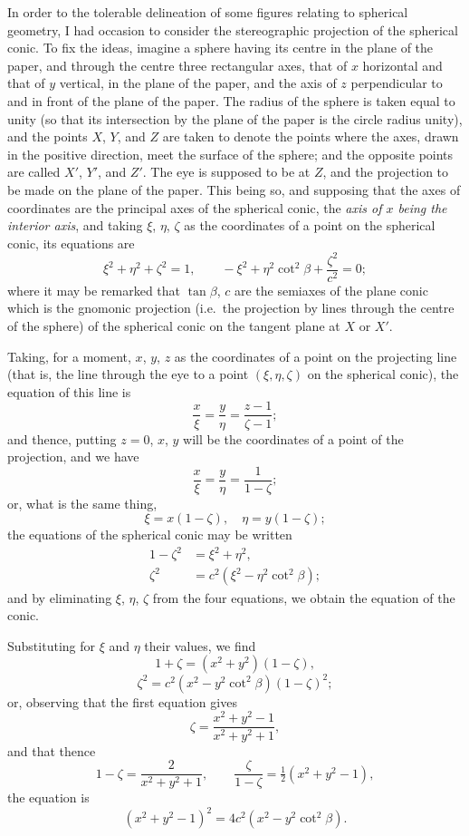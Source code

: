\documentclass[11pt,a4paper]{article}
\theoremstyle{plain}
\begin{document}
In order to the tolerable delineation of some figures relating to spherical geometry, I had occasion to consider the stereographic projection of the spherical conic. To fix the ideas, imagine a sphere having its centre in the plane of the paper, and through the centre three rectangular axes, that of $x$ horizontal and that of $y$ vertical, in the plane of the paper, and the axis of $z$ perpendicular to and in front of the plane of the paper. The radius of the sphere is taken equal to unity (so that its intersection by the plane of the paper is the circle radius unity), and the points $X$, $Y$, and $Z$ are taken to denote the points where the axes, drawn in the positive direction, meet the surface of the sphere; and the opposite points are called $X'$, $Y'$, and $Z'$. The eye is supposed to be at $Z$, and the projection to be made on the plane of the paper. This being so, and supposing that the axes of coordinates are the principal axes of the spherical conic, the \textit{axis of $x$ being the interior axis}, and taking $\xi$, $\eta$, $\zeta$ as the coordinates of a point on the spherical conic, its equations are
\[
\xi^2 + \eta^2 + \zeta^2 = 1, \qquad -\xi^2 + \eta^2\cot^2\beta + \frac{\zeta^2}{c^2} = 0;
\]
where it may be remarked that $\tan\beta$, $c$ are the semiaxes of the plane conic which is the gnomonic projection (i.e.\ the projection by lines through the centre of the sphere) of the spherical conic on the tangent plane at $X$ or $X'$.

Taking, for a moment, $x$, $y$, $z$ as the coordinates of a point on the projecting line (that is, the line through the eye to a point $(\xi,\eta,\zeta)$ on the spherical conic), the equation of this line is
\[
\frac{x}{\xi} = \frac{y}{\eta} = \frac{z - 1}{\zeta - 1};
\]
\newpage
and thence, putting $z = 0$, $x$, $y$ will be the coordinates of a point of the projection, and we have
\[
\frac{x}{\xi} = \frac{y}{\eta} = \frac{1}{1 - \zeta};
\]
or, what is the same thing,
\[
\xi = x(1 - \zeta), \quad \eta = y(1 - \zeta);
\]
the equations of the spherical conic may be written
\begin{align*}
1 - \zeta^2 &= \xi^2 + \eta^2, \\
\zeta^2 &= c^2(\xi^2 - \eta^2\cot^2\beta);
\end{align*}
and by eliminating $\xi$, $\eta$, $\zeta$ from the four equations, we obtain the equation of the conic.

Substituting for $\xi$ and $\eta$ their values, we find
\[
1 + \zeta = (x^2 + y^2)(1 - \zeta),
\]
\[
\zeta^2 = c^2(x^2 - y^2\cot^2\beta)(1 - \zeta)^2;
\]
or, observing that the first equation gives
\[
\zeta = \frac{x^2 + y^2 - 1}{x^2 + y^2 + 1},
\]
and that thence
\[
1 - \zeta = \frac{2}{x^2 + y^2 + 1}, \qquad \frac{\zeta}{1 - \zeta} = \tfrac{1}{2}(x^2 + y^2 - 1),
\]
the equation is
\[
(x^2 + y^2 - 1)^2 = 4c^2(x^2 - y^2\cot^2\beta).
\]
\end{document}
